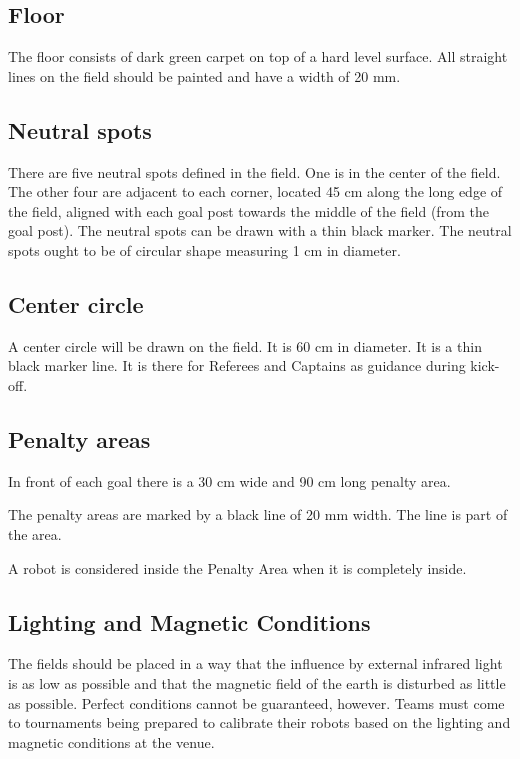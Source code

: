 \documentclass{article}
\begin{document}
\subsection{ Floor \label{ref-033}}

The floor consists of dark green carpet on top of a hard level surface.
 All straight lines on the field should be painted and
have a width of 20 mm.

\subsection{ Neutral spots \label{ref-034}}

There are five neutral spots defined in the field. One is in the center of the
field. The other four are adjacent to each corner, located 45 cm along the long
edge of the field, aligned with each goal post towards the middle of the field
(from the goal post). The neutral spots can be drawn with a thin black marker.
The neutral spots ought to be of circular shape measuring 1 cm in diameter.

\subsection{ Center circle \label{ref-035}}

A center circle will be drawn on the field. It is 60 cm in diameter. It is a
thin black marker line. It is there for Referees and Captains as guidance
during kick-off.

\subsection{ Penalty areas \label{ref-036}}

In front of each goal there is a 30 cm wide and 90 cm long penalty area.

The penalty areas are marked by a black line of 20 mm width. The line is part
of the area.

A robot is considered inside the Penalty Area when it is completely inside.

\subsection{Lighting and Magnetic Conditions \label{ref-037}}

The fields should be placed in a way that the influence by external infrared
light is as low as possible and that the magnetic field of the earth is
disturbed as little as possible. Perfect conditions cannot be guaranteed,
however. Teams must come to tournaments being prepared to calibrate their
robots based on the lighting and magnetic conditions at the venue.
\end{document}
